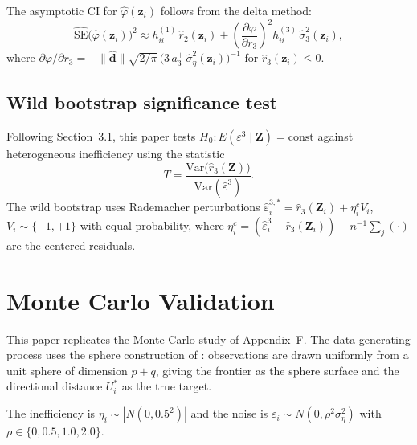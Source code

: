 \documentclass[article]{jss}
\begin{document}
The asymptotic CI for $\hat{\varphi}(\mathbf{z}_i)$ follows from the
delta method:
%
\begin{equation}
  \widehat{\mathrm{SE}}\bigl(\hat{\varphi}(\mathbf{z}_i)\bigr)^2
  \approx
  h^{(1)}_{ii}\,\hat{r}_2(\mathbf{z}_i) +
  \left(\frac{\partial\varphi}{\partial r_3}\right)^2
  h^{(3)}_{ii}\,\hat{\sigma}^2_3(\mathbf{z}_i),
\end{equation}
%
where
$\partial\varphi/\partial r_3
 = -\|\hat{\mathbf{d}}\|\sqrt{2/\pi}\,
   \bigl(3\,a_3^+\,\hat{\sigma}^2_\eta(\mathbf{z}_i)\bigr)^{-1}$
for $\hat{r}_3(\mathbf{z}_i)\leq 0$.

\subsection{Wild bootstrap significance test}
\label{sec:wildbootstrap}

Following \citet{PSVKZ2024} Section~3.1, this paper tests
$H_0: E(\varepsilon^3 \mid \mathbf{Z}) = \mathrm{const}$
against heterogeneous inefficiency using the statistic
%
\begin{equation}
  T = \frac{\mathrm{Var}\bigl(\hat{r}_3(\mathbf{Z})\bigr)}
           {\mathrm{Var}(\hat{\varepsilon}^3)}.
\end{equation}
%
The wild bootstrap uses Rademacher perturbations
$\hat{\varepsilon}^{3,*}_i = \hat{r}_3(\mathbf{Z}_i) + \eta^c_i V_i$,
$V_i \sim \{-1,+1\}$ with equal probability, where
$\eta^c_i = (\hat{\varepsilon}^3_i - \hat{r}_3(\mathbf{Z}_i))
             - n^{-1}\sum_j(\cdot)$
are the centered residuals.



\section[Monte Carlo validation]{Monte Carlo Validation}
\label{sec:mc}

This paper replicates the Monte Carlo study of \citet{SimarWilson2023}
Appendix~F.  The data-generating process uses the sphere construction of
\citet{Marsaglia1972}: observations are drawn uniformly from a unit
sphere of dimension $p+q$, giving the frontier as the sphere surface and
the directional distance $U^*_i$ as the true target.

The inefficiency is $\eta_i \sim |N(0,0.5^2)|$ and the noise is
$\varepsilon_i \sim N(0, \rho^2 \sigma_\eta^2)$
with $\rho \in \{0, 0.5, 1.0, 2.0\}$.
\end{document}

